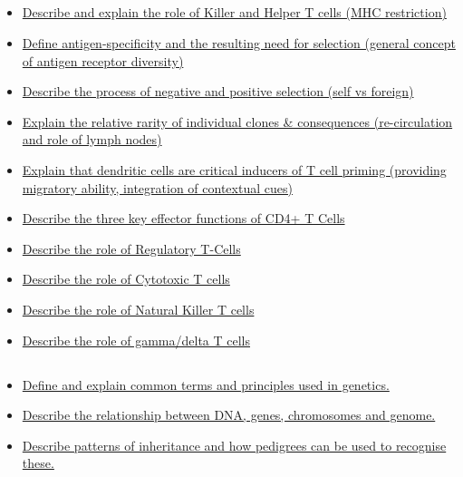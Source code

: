 \documentclass[10pt, a4paper]{article}
\begin{document}
\subsection{} \begin{itemize} \item \href{https://www.notion.so/1935a723978f40d0ba892eca2b5dde97}{Describe and explain the role of Killer and Helper T cells (MHC restriction)} \item \href{https://www.notion.so/07b6afb24bb649cf9d69734ea7e73380}{Define antigen-specificity and the resulting need for selection (general concept of antigen receptor diversity)} \item \href{https://www.notion.so/02e189ce7831419cb61829a4e1935ef7}{Describe the process of negative and positive selection (self vs foreign)} \item \href{https://www.notion.so/0a96d9aeaafd48b2beb1b0f70211b738}{Explain the relative rarity of individual clones \& consequences (re-circulation and role of lymph nodes)} \item \href{https://www.notion.so/54bb915d489b46088f99daae672004c1}{Explain that dendritic cells are critical inducers of T cell priming (providing migratory ability, integration of contextual cues)} \item \href{https://www.notion.so/c1af47ec300b42a08d5a565272ffde79}{Describe the three key effector functions of CD4+ T Cells} \item \href{https://www.notion.so/fbd99b9e926b4fe89ad4aeac57f37c54}{Describe the role of Regulatory T-Cells} \item \href{https://www.notion.so/ac2f83d0cad3429198d6af0afe94fcad}{Describe the role of Cytotoxic T cells} \item \href{https://www.notion.so/c7550a7f4c0542f8b2ef81f3fb7f40bf}{Describe the role of Natural Killer T cells} \item \href{https://www.notion.so/21b060cf4a8f4438b7705c4d991e8817}{Describe the role of gamma/delta T cells} \end{itemize}
\subsection{} \begin{itemize} \item \href{https://www.notion.so/ff14c59e116b49639e0c333b8b6f6ca9}{Define and explain common terms and principles used in genetics.} \item \href{https://www.notion.so/ac5806e89ccf40a58fee18135eb7ed3f}{Describe the relationship between DNA, genes, chromosomes and genome.} \item \href{https://www.notion.so/64c9394250db446d9f82e690e0682526}{Describe patterns of inheritance and how pedigrees can be used to recognise these.} \end{itemize}
\end{document}
